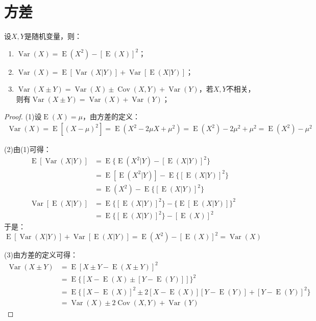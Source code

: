 \section{方差}

\begin{property}\label{prop:Variance}
	设$X,Y$是随机变量，则：
	\begin{enumerate}
		\item $\operatorname{Var}(X)=\operatorname{E}(X^2)-[\operatorname{E}(X)]^2$；
		\item $\operatorname{Var}(X)=\operatorname{E}[\operatorname{Var}(X|Y)]+\operatorname{Var}[\operatorname{E}(X|Y)]$；
		\item $\operatorname{Var}(X\pm Y)=\operatorname{Var}(X)\pm\operatorname{Cov}(X,Y)+\operatorname{Var}(Y)$，若$X,Y$不相关，则有$\operatorname{Var}(X\pm Y)=\operatorname{Var}(X)+\operatorname{Var}(Y)$；
	\end{enumerate}
\end{property}
\begin{proof}
	(1)设$\operatorname{E}(X)=\mu$，由方差的定义：
	\begin{align*}
		\operatorname{Var}(X)
		=\operatorname{E}[(X-\mu)^2]
		=\operatorname{E}(X^2-2\mu X+\mu^2)
		=\operatorname{E}(X^2)-2\mu^2+\mu^2
		=\operatorname{E}(X^2)-\mu^2
	\end{align*}\par
	(2)由(1)可得：
	\begin{align*}
		\operatorname{E}[\operatorname{Var}(X|Y)]
		&=\operatorname{E}\{\operatorname{E}(X^2|Y)-[\operatorname{E}(X|Y)]^2\} \\
		&=\operatorname{E}[\operatorname{E}(X^2|Y)]-\operatorname{E}\{[\operatorname{E}(X|Y)]^2\} \\
		&=\operatorname{E}(X^2)-\operatorname{E}\{[\operatorname{E}(X|Y)]^2\} \\
		\operatorname{Var}[\operatorname{E}(X|Y)]
		&=\operatorname{E}\{[\operatorname{E}(X|Y)]^2\}-\{\operatorname{E}[\operatorname{E}(X|Y)]\}^2 \\
		&=\operatorname{E}\{[\operatorname{E}(X|Y)]^2\}-[\operatorname{E}(X)]^2
	\end{align*}
	于是：
	\begin{equation*}
		\operatorname{E}[\operatorname{Var}(X|Y)]+\operatorname{Var}[\operatorname{E}(X|Y)]=\operatorname{E}(X^2)-[\operatorname{E}(X)]^2=\operatorname{Var}(X)
	\end{equation*}\par
	(3)由方差的定义可得：
	\begin{align*}
		\operatorname{Var}(X\pm Y)
		&=\operatorname{E}[X\pm Y-\operatorname{E}(X\pm Y)]^2 \\
		&=\operatorname{E}\{[X-\operatorname{E}(X)\pm[Y-\operatorname{E}(Y)]]\}^2 \\
		&=\operatorname{E}\{[X-\operatorname{E}(X)]^2\pm 2[X-\operatorname{E}(X)][Y-\operatorname{E}(Y)]+[Y-\operatorname{E}(Y)]^2\} \\
		&=\operatorname{Var}(X)\pm2\operatorname{Cov}(X,Y)+\operatorname{Var}(Y)
	\end{align*}
\end{proof}

